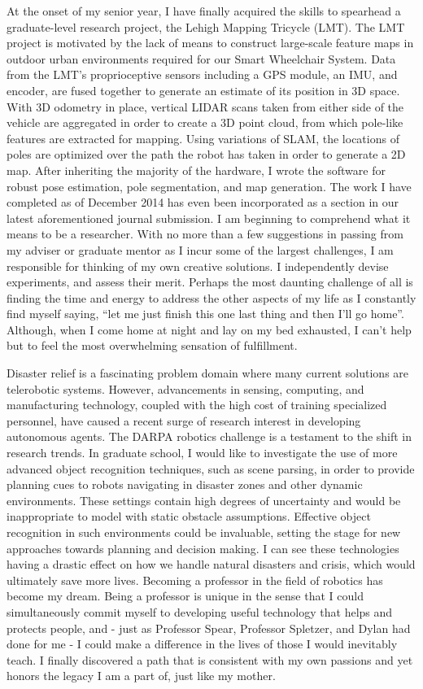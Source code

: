 \documentclass[12pt]{article}
\begin{document}
At the onset of my senior year, I have finally acquired the skills to spearhead
a graduate-level research project, the Lehigh Mapping Tricycle (LMT). The LMT
project is motivated by the lack of means to construct large-scale feature maps
in outdoor urban environments required for our Smart Wheelchair System.  Data
from the LMT's proprioceptive sensors including a GPS module, an IMU, and
encoder, are fused together to generate an estimate of its position in 3D
space. With 3D odometry in place, vertical LIDAR scans taken from either side
of the vehicle are aggregated in order to create a 3D point cloud, from which
pole-like features are extracted for mapping. Using variations of SLAM, the
locations of poles are optimized over the path the robot has taken in order to
generate a 2D map.  After inheriting the majority of the hardware, I wrote the
software for robust pose estimation, pole segmentation, and map generation. The
work I have completed as of December 2014 has even been incorporated as a
section in our latest aforementioned journal submission. I am beginning to
comprehend what it means to be a researcher. With no more than a few
suggestions in passing from my adviser or graduate mentor as I incur some of
the largest challenges, I am responsible for thinking of my own creative
solutions. I independently devise experiments, and assess their merit.  Perhaps
the most daunting challenge of all is finding the time  and energy to address
the other aspects of my life as I constantly find myself saying, ``let me just
finish this one last thing and then I'll go home''. Although, when I come home
at night and lay on my bed exhausted, I can't help but to feel the most
overwhelming sensation of fulfillment.

Disaster relief is a fascinating problem domain where many current solutions
are telerobotic systems. However, advancements in sensing, computing, and
manufacturing technology, coupled with the high cost of training specialized
personnel, have caused a recent surge of research interest in developing
autonomous agents. The DARPA robotics challenge is a testament to the shift in
research trends. In graduate school, I would like to investigate the use of
more advanced object recognition techniques, such as scene parsing, in order to
provide planning cues to robots navigating in disaster zones and other dynamic
environments.  These settings contain high degrees of uncertainty and would be
inappropriate to model with static obstacle assumptions. Effective object
recognition in such environments could be invaluable, setting the stage for new
approaches towards planning and decision making. I can see these technologies
having a drastic effect on how we handle natural disasters and crisis, which
would ultimately save more lives. Becoming a professor in the field of robotics
has become my dream. Being a professor is unique in the sense that I could
simultaneously commit myself to developing useful technology that helps and
protects people, and - just as Professor Spear, Professor Spletzer, and Dylan
had done for me - I could make a difference in the lives of those I would
inevitably teach. I finally discovered a path that is consistent with my own
passions and yet honors the legacy I am a part of, just like my mother.
\end{document}
